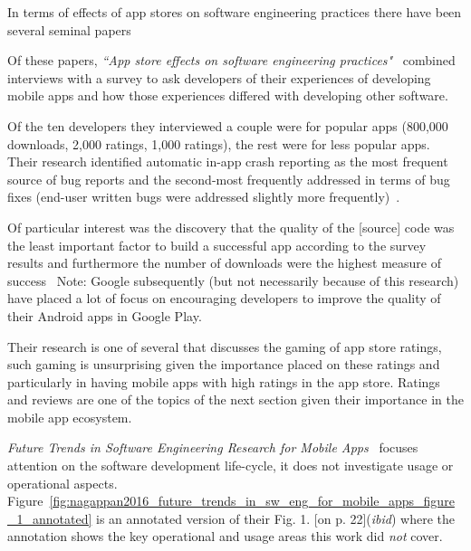 In terms of effects of app stores on software engineering practices there have been several seminal papers %

Of these papers, \emph{``App store effects on software engineering practices"}~ combined interviews with a survey to ask developers of their experiences of developing mobile apps and how those experiences differed with developing other software.

Of the ten developers they interviewed a couple were for popular apps (800,000 downloads, 2,000 ratings, 1,000 ratings), the rest were for less popular apps. %
Their research identified automatic in-app crash reporting as the most frequent source of bug reports and the second-most frequently addressed in terms of bug fixes (end-user written bugs were addressed slightly more frequently)~\cite[p. 10]{alsubaihin2019app_store_effects_on_software_engineering}. 

Of particular interest was the discovery that the quality of the [source] code was the least important factor to build a successful app according to the survey results and furthermore the number of downloads were the highest measure of success~\cite[p. 13]{alsubaihin2019app_store_effects_on_software_engineering}%
Note: Google subsequently (but not necessarily because of this research) have placed a lot of focus on encouraging developers to improve the quality of their Android apps in Google Play. 

Their research is one of several that discusses the gaming of app store ratings, such gaming is unsurprising given the importance placed on these ratings and particularly in having mobile apps with high ratings in the app store. Ratings and reviews are one of the topics of the next section  given their importance in the mobile app ecosystem.

\emph{Future Trends in Software Engineering Research for Mobile Apps}~ focuses attention on the software development life-cycle, it does not investigate usage or operational aspects. Figure~\ref{fig:nagappan2016_future_trends_in_sw_eng_for_mobile_apps_figure_1_annotated} is an annotated version of their Fig. 1. [on p. 22](\textit{ibid}) where the annotation shows the key operational and usage areas this work did \emph{not} cover. 


